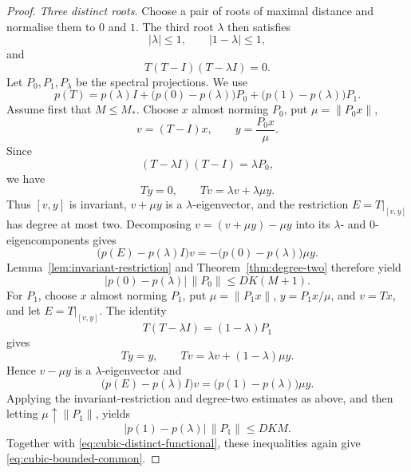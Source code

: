 \documentclass[a4paper]{amsart}
\theoremstyle{remark}
\begin{document}
\begin{proof}
\smallskip
\noindent\emph{Three distinct roots.}
Choose a pair of roots of maximal distance and normalise them to \(0\) and \(1\).  The third root \(\lambda\) then satisfies
\[
       |\lambda|\leqslant1,
       \qquad
       |1-\lambda|\leqslant1,
\]
and
\[
       T(T-I)(T-\lambda I)=0.
\]
Let \(P_0,P_1,P_\lambda\) be the spectral projections.  We use
\begin{equation}\label{eq:cubic-distinct-functional}
       p(T)=p(\lambda)I+
       \bigl(p(0)-p(\lambda)\bigr)P_0+
       \bigl(p(1)-p(\lambda)\bigr)P_1.
\end{equation}
Assume first that \(M\leqslant M_*\).  Choose \(x\) almost norming \(P_0\), put \(\mu=\|P_0x\|\),
\[
       v=(T-I)x,
       \qquad
       y=\frac{P_0x}{\mu}.
\]
Since
\[
       (T-\lambda I)(T-I)=\lambda P_0,
\]
we have
\[
       Ty=0,
       \qquad
       Tv=\lambda v+\lambda\mu y.
\]
Thus \([v,y]\) is invariant, \(v+\mu y\) is a \(\lambda\)-eigenvector, and the
restriction \(E=T|_{[v,y]}\) has degree at most two.  Decomposing
\(v=(v+\mu y)-\mu y\) into its \(\lambda\)- and \(0\)-eigencomponents gives
\[
       \bigl(p(E)-p(\lambda)I\bigr)v
       =-\bigl(p(0)-p(\lambda)\bigr)\mu y.
\]
Lemma~\ref{lem:invariant-restriction} and Theorem~\ref{thm:degree-two} therefore yield
\begin{equation}\label{eq:cubic-P0-bound}
       |p(0)-p(\lambda)|\,\|P_0\|
       \leqslant DK(M+1).
\end{equation}
For \(P_1\), choose \(x\) almost norming \(P_1\), put
\(\mu=\|P_1x\|\), \(y=P_1x/\mu\), and \(v=Tx\), and let
\(E=T|_{[v,y]}\).  The identity
\[
       T(T-\lambda I)=(1-\lambda)P_1
\]
gives
\[
       Ty=y,
       \qquad
       Tv=\lambda v+(1-\lambda)\mu y.
\]
Hence \(v-\mu y\) is a \(\lambda\)-eigenvector and
\[
       \bigl(p(E)-p(\lambda)I\bigr)v
       =\bigl(p(1)-p(\lambda)\bigr)\mu y.
\]
Applying the invariant-restriction and degree-two estimates as above, and
then letting \(\mu\uparrow\|P_1\|\), yields
\begin{equation}\label{eq:cubic-P1-bound}
       |p(1)-p(\lambda)|\,\|P_1\|
       \leqslant DKM.
\end{equation}
Together with \eqref{eq:cubic-distinct-functional}, these inequalities again give \eqref{eq:cubic-bounded-common}.


\end{proof}
\end{document}
